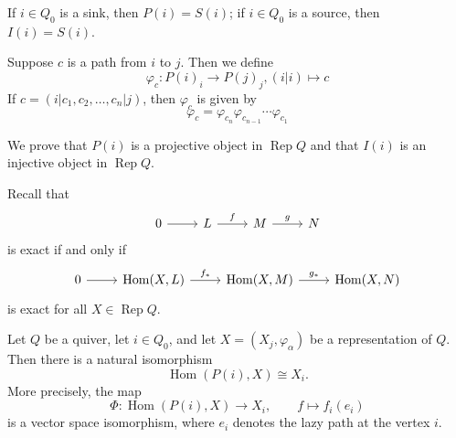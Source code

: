 \documentclass[11pt, a4paper]{report}
\begin{document}
\begin{remark}
    If $i \in Q_0$ is a sink, then $P(i)=S(i)$; if $i \in Q_0$ is a source, then $I(i)=S(i)$.
\end{remark}

\begin{remark}
    Suppose $c$ is a path from $i$ to $j$. Then we define
    \[
        \varphi_c: P(i)_i \to P(j)_j, (i|i) \mapsto c
    \]
    If $c=(i|c_1,c_2,\ldots,c_n|j)$, then $\varphi_c$ is given by
    \[
        \varphi_c =  \varphi_{c_n} \varphi_{c_{n-1}} \cdots \varphi_{c_1}
    \]
\end{remark}

We prove that $P(i)$ is a projective object in $\operatorname{Rep}Q$ and that $I(i)$ is an injective object in $\operatorname{Rep}Q$.

Recall that
\[
    \begin{tikzcd}
        0 \arrow[r] & L \arrow[r, "f"] & M \arrow[r, "g"] & N
    \end{tikzcd}
\]
is exact if and only if
\[
    \begin{tikzcd}
        0 \arrow[r] & {\operatorname{Hom}(X,L)} \arrow[r, "f_*"] & {\operatorname{Hom}(X,M)} \arrow[r, "g_*"] & {\operatorname{Hom}(X,N)}
    \end{tikzcd}
\]
is exact for all $X \in \operatorname{Rep}Q$.

\begin{lemma}[Yoneda]\label{lem:Hom-Pi-X}
    Let $Q$ be a quiver, let $i\in Q_0$, and let $X=(X_j,\varphi_\alpha)$ be a representation of $Q$. Then there is a natural isomorphism
    \[
        \operatorname{Hom}(P(i),X)\cong X_i.
    \]
    More precisely, the map
    \[
        \Phi:\operatorname{Hom}(P(i),X)\longrightarrow X_i,
        \qquad
        f\longmapsto f_i(e_i)
    \]
    is a vector space isomorphism, where $e_i$ denotes the lazy path at the vertex $i$.
\end{lemma}
\end{document}
